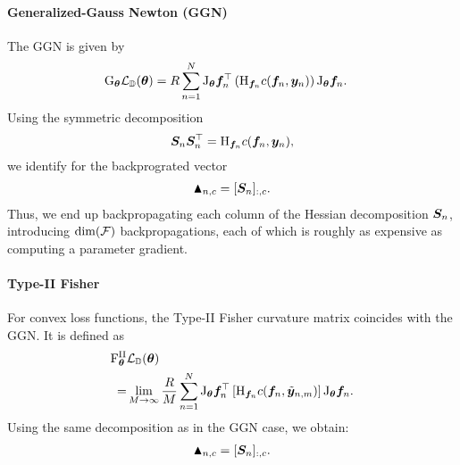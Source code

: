 \paragraph{Generalized-Gauss Newton (GGN)}
The GGN is given by\begin{align*}
\mathrm{G}_{{\bm{\theta}}}{\mathcal{L}}_{{\mathbb{D}}}({\bm{\theta}})
&= R \sum_{n=1}^N
  \mathrm{J}_{{\bm{\theta}}} {\bm{f}}_n^{\top}
  \left(
  \mathrm{H}_{{\bm{f}}_n} c({\bm{f}}_n, {\bm{y}}_n)
  \right)
  \mathrm{J}_{{\bm{\theta}}} {\bm{f}}_n.
\end{align*}
Using the symmetric decomposition
$${\bm{S}}_n {\bm{S}}_n^{\top} = \mathrm{H}_{{\bm{f}}_n} c({\bm{f}}_n, {\bm{y}}_n),$$ we identify for the backprograted vector
\begin{align*}
  \blacktriangle_{n,c} = [{\bm{S}}_n]_{:,c}.
\end{align*}
Thus, we end up backpropagating each column of the Hessian decomposition ${\bm{S}}_n$, introducing $\dim({\mathcal{F}})$ backpropagations, each of which is roughly as expensive as computing a parameter gradient.

\paragraph{Type-II Fisher}
For convex loss functions, the Type-II Fisher curvature matrix coincides with the GGN. It is defined as
\begin{align*}
\mathrm{F}^{\text{II}}_{{\bm{\theta}}}&{\mathcal{L}}_{{\mathbb{D}}}({\bm{\theta}}) \\
=& \lim_{M \to \infty}
  \frac{R}{M} \sum_{n=1}^N
  \mathrm{J}_{{\bm{\theta}}} {\bm{f}}_n^{\top}
  \left[
  \mathrm{H}_{{\bm{f}}_n} c({\bm{f}}_n, \tilde{{\bm{y}}}_{n,m})
  \right]
  \mathrm{J}_{{\bm{\theta}}} {\bm{f}}_n.
\end{align*}
Using the same decomposition as in the GGN case, we obtain:
\begin{align*}
  \blacktriangle_{n,c} = [{\bm{S}}_n]_{:,c}.
\end{align*}

